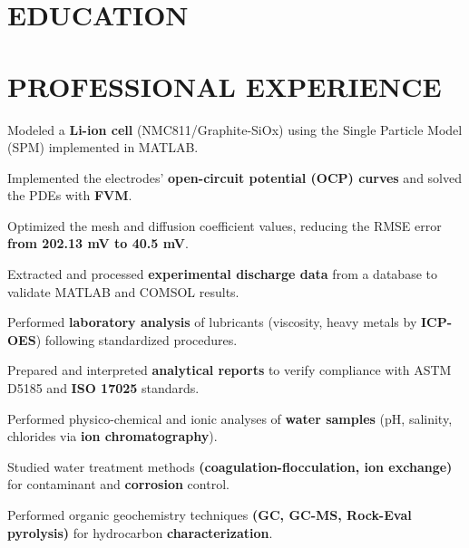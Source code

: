 \documentclass[10pt]{article}
\begin{document}

\section{EDUCATION}

\section{PROFESSIONAL EXPERIENCE}
\begin{bul}
\item Modeled a \textbf{Li-ion cell} (NMC811/Graphite-SiOx) using the Single Particle Model (SPM) implemented in MATLAB.
\item Implemented the electrodes' \textbf{open-circuit potential (OCP) curves} and solved the PDEs with \textbf{FVM}.
\item Optimized the mesh and diffusion coefficient values, reducing the RMSE error \textbf{from 202.13 mV to 40.5 mV}.
\item Extracted and processed \textbf{experimental discharge data} from a database to validate MATLAB and COMSOL results.
\end{bul}
\begin{bul}
\item Performed \textbf{laboratory analysis} of lubricants (viscosity, heavy metals by \textbf{ICP-OES}) following standardized procedures.
\item Prepared and interpreted \textbf{analytical reports} to verify compliance with ASTM D5185 and \textbf{ISO 17025} standards.
\end{bul}
\begin{bul}
\item Performed physico-chemical and ionic analyses of \textbf{water samples} (pH, salinity, chlorides via \textbf{ion chromatography}).
\item Studied water treatment methods \textbf{(coagulation-flocculation, ion exchange)} for contaminant and \textbf{corrosion} control.
\item Performed organic geochemistry techniques \textbf{(GC, GC-MS, Rock-Eval pyrolysis)} for hydrocarbon \textbf{characterization}.
\end{bul}
\end{document}
